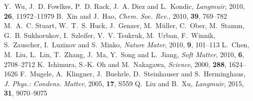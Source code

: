 \documentclass[twoside,twocolumn,9pt]{article}
\begin{document}
\begin{mcitethebibliography}{38}
Y.~Wu, J.~D. Fowlkes, P.~D. Rack, J.~A. Diez and L.~Kondic, \emph{Langmuir}, 2010, \textbf{26}, 11972--11979\relax
\mciteBstWouldAddEndPuncttrue
\mciteSetBstMidEndSepPunct{\mcitedefaultmidpunct}
{\mcitedefaultendpunct}{\mcitedefaultseppunct}\relax
\EndOfBibitem
{}
B.~Xin and J.~Hao, \emph{Chem. Soc. Rev.}, 2010, \textbf{39}, 769--782\relax
\mciteBstWouldAddEndPuncttrue
\mciteSetBstMidEndSepPunct{\mcitedefaultmidpunct}
{\mcitedefaultendpunct}{\mcitedefaultseppunct}\relax
\EndOfBibitem
{}
M.~A.~C. Stuart, W.~T.~S. Huck, J.~Genzer, M.~M{\"u}ller, C.~Ober, M.~Stamm, G.~B. Sukhorukov, I.~Szleifer, V.~V. Tsukruk, M.~Urban, F.~Winnik, S.~Zauscher, I.~Luzinov and S.~Minko, \emph{Nature Mater}, 2010, \textbf{9}, 101--113\relax
\mciteBstWouldAddEndPuncttrue
\mciteSetBstMidEndSepPunct{\mcitedefaultmidpunct}
{\mcitedefaultendpunct}{\mcitedefaultseppunct}\relax
\EndOfBibitem
{}
L.~Chen, M.~Liu, L.~Lin, T.~Zhang, J.~Ma, Y.~Song and L.~Jiang, \emph{Soft Matter}, 2010, \textbf{6}, 2708--2712\relax
\mciteBstWouldAddEndPuncttrue
\mciteSetBstMidEndSepPunct{\mcitedefaultmidpunct}
{\mcitedefaultendpunct}{\mcitedefaultseppunct}\relax
\EndOfBibitem
{}
K.~Ichimura, S.-K. Oh and M.~Nakagawa, \emph{Science}, 2000, \textbf{288}, 1624--1626\relax
\mciteBstWouldAddEndPuncttrue
\mciteSetBstMidEndSepPunct{\mcitedefaultmidpunct}
{\mcitedefaultendpunct}{\mcitedefaultseppunct}\relax
\EndOfBibitem
{}
F.~Mugele, A.~Klingner, J.~Buehrle, D.~Steinhauser and S.~Herminghaus, \emph{J. Phys.: Condens. Matter}, 2005, \textbf{17}, S559\relax
\mciteBstWouldAddEndPuncttrue
\mciteSetBstMidEndSepPunct{\mcitedefaultmidpunct}
{\mcitedefaultendpunct}{\mcitedefaultseppunct}\relax
\EndOfBibitem
{}
Q.~Liu and B.~Xu, \emph{Langmuir}, 2015, \textbf{31}, 9070--9075\relax
\mciteBstWouldAddEndPuncttrue
\mciteSetBstMidEndSepPunct{\mcitedefaultmidpunct}
{\mcitedefaultendpunct}{\mcitedefaultseppunct}\relax
\EndOfBibitem
{}

\end{mcitethebibliography}
\end{document}
